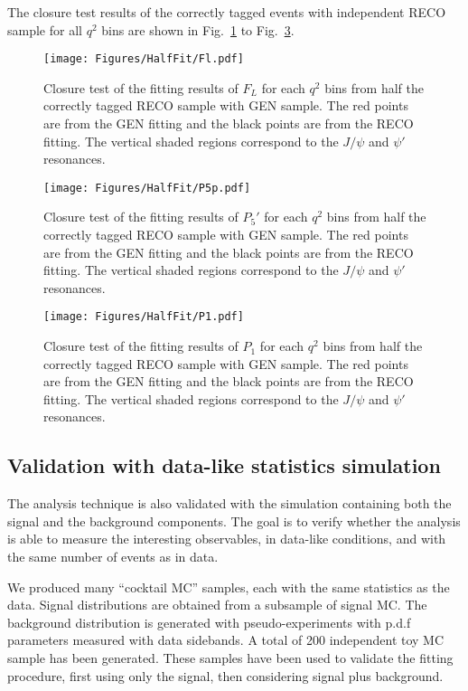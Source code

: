 The closure test results of the correctly tagged events with
independent RECO sample for all $q^2$ bins are shown in
Fig.~\ref{fig:hc-closure-fl} to
Fig.~\ref{fig:hc-closure-p1}.

\begin{figure}[!hbt]
  \centering
  \texttt{[image: Figures/HalfFit/Fl.pdf]}
  \caption{Closure test of the fitting results of $F_L$ for each $q^2$
    bins from half the correctly tagged RECO sample with GEN sample.
    The red points are from the GEN fitting and the black points are from
    the RECO fitting. The vertical shaded regions correspond to the $J/\psi$ and $\psi'$ resonances. }
  \label{fig:hc-closure-fl}
\end{figure}


\begin{figure}[!hbt]
  \centering
  \texttt{[image: Figures/HalfFit/P5p.pdf]}
  \caption{Closure test of the fitting results of $P_5'$ for each
    $q^2$ bins from half the correctly tagged RECO sample with GEN
    sample.  The red points are from the GEN fitting and the black points
    are from the RECO fitting. The vertical shaded regions correspond to the $J/\psi$ and $\psi'$ resonances. }
  \label{fig:hc-closure-p5p}
\end{figure}

\begin{figure}[!hbt]
  \centering
  \texttt{[image: Figures/HalfFit/P1.pdf]}
  \caption{Closure test of the fitting results of $P_1$ for each $q^2$
    bins from half the correctly tagged RECO sample with GEN sample.
    The red points are from the GEN fitting and the black points are from
    the RECO fitting. The vertical shaded regions correspond to the $J/\psi$ and $\psi'$ resonances. }
  \label{fig:hc-closure-p1}
\end{figure}


\subsection{Validation with data-like statistics simulation}
\label{sec:Cocktail-MC}

The analysis technique is also validated with the simulation
containing both the signal and the background components. The goal is
to verify whether the analysis is able to measure the interesting
observables, in data-like conditions, and with the same number of
events as in data.

We produced many ``cocktail MC'' samples, each with the same
statistics as the data. Signal distributions are obtained from a subsample of signal
MC. The background distribution is generated with pseudo-experiments with p.d.f
parameters measured with data sidebands.
A total of 200 independent toy MC sample has been generated.
These samples have been used to validate the fitting procedure, first using only
the signal, then considering signal plus background.

